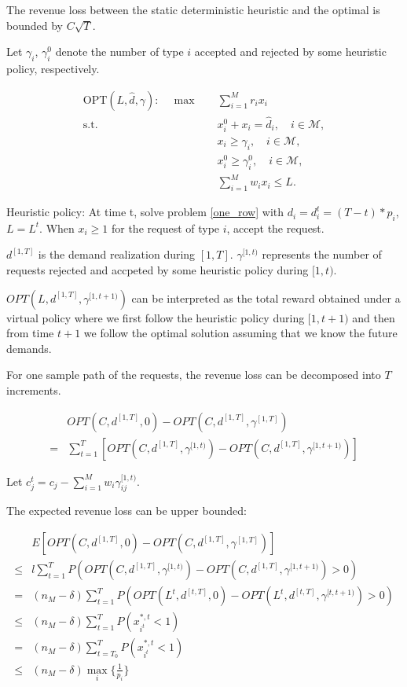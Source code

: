 The revenue loss between the static deterministic heuristic and the optimal is bounded by $C \sqrt{T}$.

Let $\gamma_{i}$, $\gamma_{i}^{0}$ denote the number of type $i$ accepted and rejected by some heuristic policy, respectively.



\begin{align*}
    \text{OPT}(L, \hat{d}, \gamma): \quad \max \quad & \sum_{i = 1}^{M} r_{i} x_{i} \\
    \text {s.t.} \quad & x_{i}^{0} + x_{i} = \hat{d}_{i}, \quad i \in \mathcal{M},  \\ 
    & x_{i} \geq \gamma_{i}, \quad i \in \mathcal{M}, \\
    & x_{i}^{0} \geq \gamma_{i}^{0}, \quad i \in \mathcal{M}, \\
    & \sum_{i=1}^{M} w_{i} x_{i} \leq L.
\end{align*}

Heuristic policy: At time t, solve problem \eqref{one_row} with $d_{i} = d_{i}^{t} = (T-t) * p_{i}$, $L = L^{t}$. When $x_{i}\geq 1$ for the request of type $i$, accept the request.



$d^{[1, T]}$ is the demand realization during $[1, T]$. $\gamma^{[1, t)}$ represents the number of requests rejected and accpeted by some heuristic policy during $[1, t)$. 

$OPT(L, d^{[1, T]}, \gamma^{[1,t+1)})$ can be interpreted as the total reward obtained under a virtual policy where we first follow the heuristic policy during $[1, t+1)$ and then from time $t+1$ we follow the optimal solution assuming that we know the future demands.

For one sample path of the requests, the revenue loss can be decomposed into $T$ increments.

\begin{align*}
    & OPT(C, d^{[1, T]}, 0) - OPT(C, d^{[1, T]}, \gamma^{[1, T]}) \\
 = & \sum_{t=1}^{T} [OPT(C, d^{[1,T]}, \gamma^{[1,t)}) - OPT(C, d^{[1,T]}, \gamma^{[1,t+1)})] 
\end{align*}

Let $c_{j}^{t} = c_{j} -\sum_{i=1}^{M} w_{i} \gamma_{ij}^{[1,t)}$. 

The expected revenue loss can be upper bounded:

\begin{align*}
    & E[OPT(C, d^{[1, T]}, 0) - OPT(C, d^{[1, T]}, \gamma^{[1, T]})] \\
 \leq & l \sum_{t=1}^{T} P(OPT(C, d^{[1, T]}, \gamma^{[1,t)}) - OPT(C, d^{[1, T]}, \gamma^{[1,t+1)}) > 0) \\
 = & (n_{M} - \delta) \sum_{t=1}^{T} P(OPT(L^{t}, d^{[t, T]}, 0) - OPT(L^{t}, d^{[t, T]}, \gamma^{[t,t+1)}) > 0) \\
 \leq & (n_{M} - \delta) \sum_{t=1}^{T} P(x_{i^{t}}^{*,t} <1) \\
 = & (n_{M} - \delta) \sum_{t=T_{0}}^{T} P(x_{i^{t}}^{*,t} <1) \\
 \leq & (n_{M} - \delta) \max_{i}\{\frac{1}{p_{i}}\} 
\end{align*}


